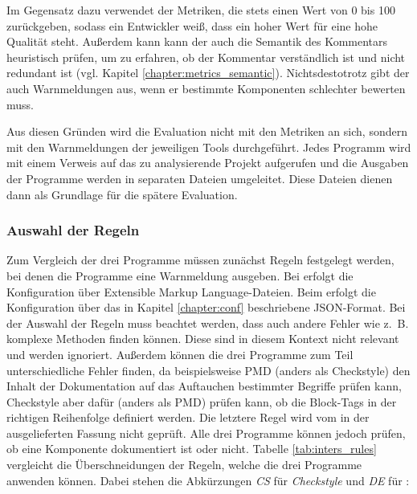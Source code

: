 Im Gegensatz dazu verwendet der \doceval Metriken, die stets einen Wert von 0 bis 100 zurückgeben, sodass ein Entwickler weiß, dass ein hoher Wert für eine hohe Qualität steht. Außerdem kann kann der \doceval auch die Semantik des Kommentars heuristisch prüfen, um zu erfahren, ob der Kommentar verständlich ist und nicht redundant ist (vgl. Kapitel \ref{chapter:metrics_semantic}). Nichtsdestotrotz gibt der \doceval auch Warnmeldungen aus, wenn er bestimmte Komponenten schlechter bewerten muss.

Aus diesen Gründen wird die Evaluation nicht mit den Metriken an sich, sondern mit den Warnmeldungen der jeweiligen Tools durchgeführt. Jedes Programm wird mit einem Verweis auf das zu analysierende Projekt aufgerufen und die Ausgaben der Programme werden in separaten Dateien umgeleitet.  Diese Dateien dienen dann als Grundlage für die spätere Evaluation. 

\subsubsection{Auswahl der Regeln}
Zum Vergleich der drei Programme müssen zunächst Regeln festgelegt werden, bei denen die Programme eine Warnmeldung ausgeben. Bei \checkpmd{} erfolgt die Konfiguration über  Extensible Markup Language-Dateien. Beim \doceval erfolgt die Konfiguration über das in Kapitel \ref{chapter:conf} beschriebene \ac{JSON}-Format. Bei der Auswahl der Regeln muss beachtet werden, dass \checkpmd auch andere Fehler wie z.~B. komplexe Methoden finden können. Diese sind in diesem Kontext nicht relevant und werden ignoriert. Außerdem können die drei Programme zum Teil unterschiedliche Fehler finden, da beispielsweise PMD (anders als Checkstyle) den Inhalt der Dokumentation auf das Auftauchen bestimmter Begriffe prüfen kann, Checkstyle aber dafür (anders als PMD) prüfen kann, ob die Block-Tags in der richtigen Reihenfolge definiert werden. Die letztere Regel wird vom \doceval in der ausgelieferten Fassung nicht geprüft. Alle drei Programme können jedoch prüfen, ob eine Komponente dokumentiert ist oder nicht. Tabelle \ref{tab:inters_rules} vergleicht die Überschneidungen der Regeln, welche die drei Programme anwenden können. Dabei stehen die Abkürzungen \textit{CS} für \textit{Checkstyle} und \textit{DE} für \doceval:

